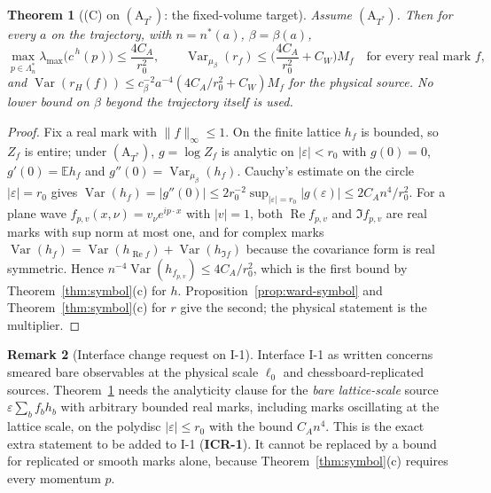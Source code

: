 \documentclass[11pt]{article}
\newtheorem{theorem}{Theorem}[section]
\theoremstyle{definition}
\newtheorem{remark}[theorem]{Remark}
\newcommand{\E}{\mathbb{E}}
\newcommand{\Var}{\operatorname{Var}}
\renewcommand{\Re}{\operatorname{Re}}
\newcommand{\lam}{\lambda_{\max}}
\begin{document}
\begin{theorem}[(C) on $(\mathrm A_{T^*})$: the fixed-volume target]\label{thm:fixedvolume}
Assume $(\mathrm A_{T^*})$. Then for every $a$ on the trajectory, with $n=n^*(a)$, $\beta=\beta(a)$,
\[
\max_{p\in\Lambda_n^*}\lam\big(\hat c^{\,h}(p)\big)\le\frac{4C_A}{r_0^2},\qquad
\Var_{\mu_\beta}(r_f)\le\Big(\frac{4C_A}{r_0^2}+C_W\Big)M_f\quad\text{for every real mark }f,
\]
and $\Var(r_H(f))\le c_\beta^{-2}a^{-4}(4C_A/r_0^2+C_W)M_f$ for the physical source. No lower bound on $\beta$ beyond the
trajectory itself is used.
\end{theorem}
\begin{proof}
Fix a real mark with $\|f\|_\infty\le1$. On the finite lattice $h_f$ is bounded, so $Z_f$ is entire; under
$(\mathrm A_{T^*})$, $g=\log Z_f$ is analytic on $|\varepsilon|<r_0$ with $g(0)=0$, $g'(0)=\E h_f$ and
$g''(0)=\Var_{\mu_\beta}(h_f)$. Cauchy's estimate on the circle $|\varepsilon|=r_0$ gives
$\Var(h_f)=|g''(0)|\le 2r_0^{-2}\sup_{|\varepsilon|=r_0}|g(\varepsilon)|\le 2C_An^4/r_0^2$.
For a plane wave $f_{p,v}(x,\nu)=v_\nu e^{ip\cdot x}$ with $|v|=1$, both $\Re f_{p,v}$ and $\Im f_{p,v}$ are real marks with
sup norm at most one, and for complex marks $\Var(h_f)=\Var(h_{\Re f})+\Var(h_{\Im f})$ because the covariance form is
real symmetric. Hence $n^{-4}\Var(h_{f_{p,v}})\le4C_A/r_0^2$, which is the first bound by Theorem~\ref{thm:symbol}(c)
for $h$. Proposition~\ref{prop:ward-symbol} and Theorem~\ref{thm:symbol}(c) for $r$ give the second; the physical
statement is the multiplier.
\end{proof}

\begin{remark}[Interface change request on I-1]\label{rem:ICR}
Interface I-1 as written concerns smeared bare observables at the physical scale $\ell_0$ and chessboard-replicated
sources. Theorem~\ref{thm:fixedvolume} needs the analyticity clause for the \emph{bare lattice-scale} source
$\varepsilon\sum_bf_bh_b$ with arbitrary bounded real marks, including marks oscillating at the lattice scale, on the
polydisc $|\varepsilon|\le r_0$ with the bound $C_An^4$. This is the exact extra statement to be added to I-1
(\textbf{ICR-1}). It cannot be replaced by a bound for replicated or smooth marks alone, because
Theorem~\ref{thm:symbol}(c) requires every momentum $p$.
\end{remark}
\end{document}
